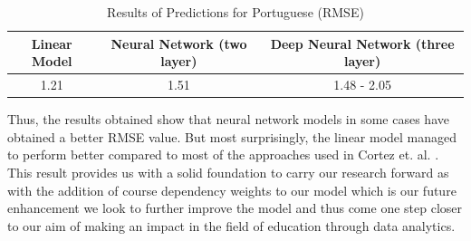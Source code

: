 \documentclass[conference]{IEEEtran}
\begin{document}
\begin{table}[!t]
\renewcommand{\arraystretch}{1.3}
\caption{Results of Predictions for Portuguese (RMSE)}
\label{table:res-por}
\centering
\begin{tabular}{|c c c|}
\hline
\bfseries Linear Model & \bfseries Neural Network (two layer) & \bfseries Deep Neural Network (three layer)\\
\hline
1.21 & 1.51 & 1.48 - 2.05\\
\hline
\end{tabular}
\end{table}

Thus, the results obtained show that neural network models in some cases have 
obtained a better RMSE value. But most surprisingly, the linear model managed to perform better compared to most of the approaches used in Cortez et. al. \cite{ref:4}. This result provides us with a solid foundation to carry our research forward as with the addition of course dependency weights to our model which is our future enhancement we look to further improve the model and thus come one step closer to our aim of making an impact in the field of education through data analytics.

\end{document}
